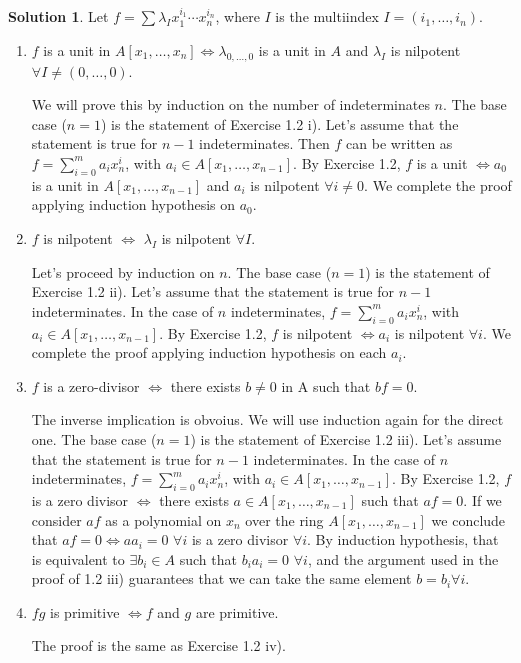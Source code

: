 \documentclass[12pt]{article}
\theoremstyle{definition}
\newtheorem*{sol}{Solution}
\begin{document}
\begin{sol}
	Let $f = \sum \lambda_{I} x_1^{i_1} \cdots x_n^{i_n}$, where $I$ is the multiindex $I = (i_1, \dots, i_n)$.

	\begin{enumerate}[label=(\roman*)]
		\item $f$ is a unit in $A[x_1, \dots, x_n] \iff \lambda_{0,\dots,0}$ is a unit in $A$ and $\lambda_I$ is nilpotent $\forall I \neq (0, \dots, 0)$. 

		We will prove this by induction on the number of indeterminates $n$. The base case ($n = 1$) is the statement of Exercise 1.2 i). Let's assume that the statement is true for $n-1$ indeterminates. Then $f$ can be written as $f = \sum_{i = 0}^m a_i x_n^i$, with $a_i \in A[x_1, \dots, x_{n-1}]$. By Exercise 1.2, $f$ is a unit $\iff a_0$ is a unit in $A[x_1, \dots, x_{n-1}]$ and $a_i$ is nilpotent $\forall i \neq 0$. We complete the proof applying induction hypothesis on $a_0$.

		\item $f$ is nilpotent $\iff$ $\lambda_I$ is nilpotent $\forall I$. 

		Let's proceed by induction on $n$. The base case ($n = 1$) is the statement of Exercise 1.2 ii). Let's assume that the statement is true for $n-1$ indeterminates. In the case of $n$ indeterminates, $f = \sum_{i = 0}^m a_i x_n^i$, with $a_i \in A[x_1, \dots, x_{n-1}]$. By Exercise 1.2, $f$ is nilpotent $\iff a_i$ is nilpotent $\forall i$. We complete the proof applying induction hypothesis on each $a_i$.

		\item $f$ is a zero-divisor $\iff$ there exists $b \neq 0$ in A such that $bf = 0$.

		The inverse implication is obvoius. We will use induction again for the direct one. The base case ($n = 1$) is the statement of Exercise 1.2 iii). Let's assume that the statement is true for $n-1$ indeterminates. In the case of $n$ indeterminates, $f = \sum_{i = 0}^m a_i x_n^i$, with $a_i \in A[x_1, \dots, x_{n-1}]$. By Exercise 1.2, $f$ is a zero divisor $\iff$ there exists $a \in A[x_1, \dots, x_{n-1}]$ such that $af = 0$. If we consider $af$ as a polynomial on $x_n$ over the ring $A[x_1, \dots, x_{n-1}]$ we conclude that $af = 0 \iff a a_i = 0 \, \, \forall i$ is a zero divisor $\forall i$. By induction hypothesis, that is equivalent to $\exists b_i \in A$ such that $b_i a_i = 0 \, \, \forall i$, and the argument used in the proof of 1.2 iii) guarantees that we can take the same element $b = b_i \forall i$.

		\item $fg$ is primitive $\iff f$ and $g$ are primitive.

		The proof is the same as Exercise 1.2 iv).

	\end{enumerate}
\end{sol}
\end{document}
